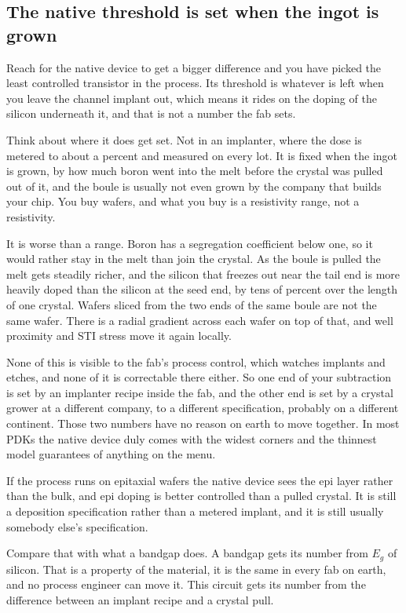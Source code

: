 \subsection{The native threshold is set when the ingot is
grown}\label{the-native-threshold-is-set-when-the-ingot-is-grown}

Reach for the native device to get a bigger difference and you have
picked the least controlled transistor in the process. Its threshold is
whatever is left when you leave the channel implant out, which means it
rides on the doping of the silicon underneath it, and that is not a
number the fab sets.

Think about where it does get set. Not in an implanter, where the dose
is metered to about a percent and measured on every lot. It is fixed
when the ingot is grown, by how much boron went into the melt before the
crystal was pulled out of it, and the boule is usually not even grown by
the company that builds your chip. You buy wafers, and what you buy is a
resistivity range, not a resistivity.

It is worse than a range. Boron has a segregation coefficient below one,
so it would rather stay in the melt than join the crystal. As the boule
is pulled the melt gets steadily richer, and the silicon that freezes
out near the tail end is more heavily doped than the silicon at the seed
end, by tens of percent over the length of one crystal. Wafers sliced
from the two ends of the same boule are not the same wafer. There is a
radial gradient across each wafer on top of that, and well proximity and
STI stress move it again locally.

None of this is visible to the fab's process control, which watches
implants and etches, and none of it is correctable there either. So one
end of your subtraction is set by an implanter recipe inside the fab,
and the other end is set by a crystal grower at a different company, to
a different specification, probably on a different continent. Those two
numbers have no reason on earth to move together. In most PDKs the
native device duly comes with the widest corners and the thinnest model
guarantees of anything on the menu.

If the process runs on epitaxial wafers the native device sees the epi
layer rather than the bulk, and epi doping is better controlled than a
pulled crystal. It is still a deposition specification rather than a
metered implant, and it is still usually somebody else's specification.

Compare that with what a bandgap does. A bandgap gets its number from
\(E_g\) of silicon. That is a property of the material, it is the same
in every fab on earth, and no process engineer can move it. This circuit
gets its number from the difference between an implant recipe and a
crystal pull.

